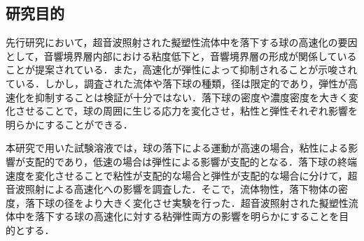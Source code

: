 \subsection{研究目的}

先行研究\cite{ref:8}において，超音波照射された擬塑性流体中を落下する球の高速化の要因として，音響境界層内部における粘度低下と，音響境界層の形成が関係していることが提案されている．また，高速化が弾性によって抑制されることが示唆されている．しかし，調査された流体や落下球の種類，径は限定的であり，弾性が高速化を抑制することは検証が十分ではない．落下球の密度や濃度密度を大きく変化させることで，球の周囲に生じる応力を変化させ，粘性と弾性それぞれ影響を明らかにすることができる．

本研究で用いた試験溶液では，球の落下による運動が高速の場合，粘性による影響が支配的であり，低速の場合は弾性による影響が支配的となる．落下球の終端速度を変化させることで粘性が支配的な場合と弾性が支配的な場合に分けて，超音波照射による高速化への影響を調査した．そこで，流体物性，落下物体の密度，落下球の径をより大きく変化させ実験を行った．超音波照射された擬塑性流体中を落下する球の高速化に対する粘弾性両方の影響を明らかにすることを目的とする．
